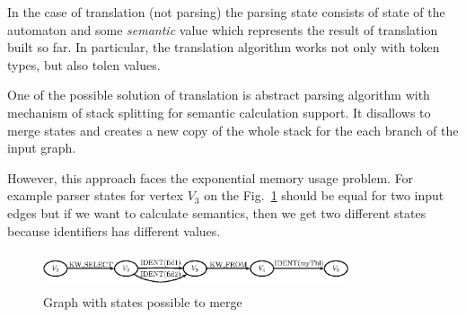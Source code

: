 
In the case of translation (not parsing) the parsing state consists of state of the automaton and some
\emph{semantic} value which represents the result of translation built so far. In particular,
the translation algorithm works not only with token types, but also tolen values. 

%


One of the possible solution of translation is abstract parsing algorithm with mechanism of stack 
splitting for semantic calculation support. It disallows to merge states and creates a new 
copy of the whole stack for the each branch of the input graph.

However, this approach faces the exponential memory usage problem. 
For example parser states for vertex $V_3$ on the Fig.~\ref{pic4} should be equal for two input edges
but if we want to calculate semantics, then we get two different states because identifiers has 
different values.

\begin{figure}
    \begin{center}
        \includegraphics[width=9cm,height=1.1cm]{graphs/states_example.eps}
        \caption{Graph with states possible to merge}
        \label{pic4}
    \end{center}
\end{figure}

